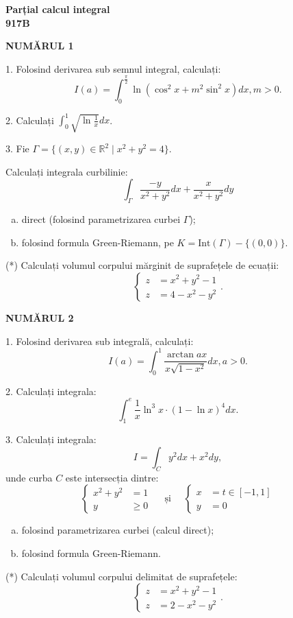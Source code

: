 \documentclass[11pt,a4paper]{article}
\newcommand\ds{\displaystyle}
\newcommand\RR{\mathbb{R}}
\theoremstyle{dotless}
\theoremstyle{dotlessdr}
\begin{document}
\begin{center}
  {\Large\textbf{Parțial calcul integral \\
      917B}}
\end{center}


\textbf{NUMĂRUL 1}

1. Folosind derivarea sub semnul integral, calculați:
\[
  I(a) = \int_0^{\frac{\pi}{2}} \ln(\cos^2 x + m^2 \sin^2 x) dx, m > 0.
\]

\vspace{1cm}

2. Calculați $ \ds\int_0^1 \sqrt{\ln \frac{1}{x}} dx $.

\vspace{1cm}

3. Fie $ \Gamma = \{ (x, y) \in \RR^2 \mid x^2 + y^2 = 4 \} $.

Calculați integrala curbilinie:
\[
  \int_\Gamma \frac{-y}{x^2 + y^2} dx + \frac{x}{x^2 + y^2} dy
\]
\begin{enumerate}[(a)]
\item direct (folosind parametrizarea curbei $ \Gamma $);
\item folosind formula Green-Riemann, pe $ K = \mathrm{Int}(\Gamma) - \{ (0, 0) \} $.
\end{enumerate}

\vspace{1cm}

(*) Calculați volumul corpului mărginit de suprafețele de ecuații:
\[
  \begin{cases}
    z &= x^2 + y^2 - 1 \\
    z & = 4 - x^2 - y^2
  \end{cases}.
\]

\newpage

\textbf{NUMĂRUL 2}

1. Folosind derivarea sub integrală, calculați:
\[
  I(a) = \int_0^1 \frac{\arctan ax}{x \sqrt{1 - x^2}} dx, a > 0.
\]

\vspace{1cm}

2. Calculați integrala:
\[
  \int_1^{e} \frac{1}{x} \ln^3 x \cdot (1 - \ln x)^4 dx.
\]

\vspace{1cm}

3. Calculați integrala:
\[
  I = \int_C y^2 dx + x^2 dy,
\]
unde curba $ C $ este intersecția dintre:
\[
  \begin{cases}
    x^2 + y^2 &= 1 \\
    y &\geq 0
  \end{cases} \quad \text{ și } \quad
  \begin{cases}
    x &= t \in [-1, 1] \\
    y &= 0
  \end{cases}
\]
\begin{enumerate}[(a)]
\item folosind parametrizarea curbei (calcul direct);
\item folosind formula Green-Riemann.
\end{enumerate}

\vspace{1cm}

(*) Calculați volumul corpului delimitat de suprafețele:
\[
  \begin{cases}
    z &= x^2 + y^2 - 1 \\
    z &= 2 - x^2 - y^2
  \end{cases}.
\]
\end{document}
